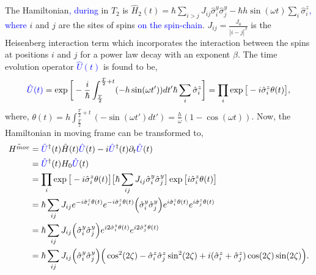 \documentclass[%
reprint,
superscriptaddress,
amsmath,amssymb,showkeys,
aps,
prb,
]{revtex4-2}
\newcommand{\blue}[1]{\textcolor{blue}{#1}}
\begin{document}
	The Hamiltonian\blue{, during} in $T_2$ is $\displaystyle \hat{H}_2(t) = \hbar\sum_{i>j} J_{ij}\hat{\sigma}^y_i\hat{\sigma}^y_j - \hbar h \sin(\omega t) \sum_i \hat{\sigma}^z_i$\blue{, where} $i$ and $j$ are the sites of spins \blue{on the spin-chain}. $J_{ij} = \frac{J_0}{|i-j|^\beta}$ is the Heisenberg interaction term which incorporates the interaction between the spins at positions  $i$ and $j$ for a power law decay with an exponent $\beta$. 
	The time evolution operator \blue{$\hat{U}(t)$} is found to be\cite{Daniel2020},
	\begin{equation}
		\blue{\hat{U}(t)} = \exp \bigg[-\frac{i}{\hbar}\int_{\frac{T}{2}}^{\frac{T}{2}+t} (-h \sin(\omega t'))dt' \hbar\sum_i\hat{\sigma}^z_i\bigg]
		=\prod_{i} \exp\big[-i \hat{\sigma}^z_i\theta(t)\big],
	\end{equation}
	where, $\displaystyle \theta (t) = h\int_{\frac{T}{2}}^{\frac{T}{2}+t}  (-\sin(\omega t')dt') =\frac{h}{\omega}(1-\cos(\omega t))$.
	Now, the Hamiltonian in moving frame can be transformed to\cite{haldar_statistical_2022, haldar_dynamical_2021},
	\begin{align}
		\hat{H^{mov}} &= \blue{\hat{U}}^\dagger(t) \hat{H}(t) \blue{\hat{U}}(t)- i \blue{\hat{U}}^\dagger(t) \partial_t \blue{\hat{U}}(t) \nonumber\\
		&= \blue{\hat{U}}^\dagger(t) H_0 \blue{\hat{U}}(t)\nonumber\\
		&= \prod_{i} \exp\big[-i\hat{\sigma}^z_i \theta(t)\big] \big[\hbar\sum_{ij}J_{ij}\hat{\sigma}^y_i\hat{\sigma}^y_j\big] \exp\big[ i\hat{\sigma}^z_i \theta(t)\big]\nonumber\\
		&= \hbar\sum_{ij} J_{ij} e^{-i\hat{\sigma}^z_i \theta(t)} e^{-i\hat{\sigma}^z_j  \theta(t)}\Big(\hat{\sigma}^y_i\hat{\sigma}^y_j\Big)e^{i\hat{\sigma}^z_i \theta(t)} e^{i\hat{\sigma}^z_j \theta(t)}\nonumber\\
		&= \hbar\sum_{ij} J_{ij} \Big(\hat{\sigma}^y_i\hat{\sigma}^y_j\Big)e^{i2\hat{\sigma}^z_i \theta(t)} e^{i2\hat{\sigma}^z_j \theta(t)}\nonumber\\
		&= \hbar\sum_{ij} J_{ij} \Big(\hat{\sigma}^y_i\hat{\sigma}^y_j\Big) \Big(\cos^2(2\zeta) -\hat{\sigma}^z_i\hat{\sigma}^z_j \sin^2(2\zeta) + i (\hat{\sigma}^z_i + \hat{\sigma}^z_j)\cos(2\zeta)\sin(2\zeta)\Big).
		\label{eq:hmovap1}
	\end{align}
\end{document}
